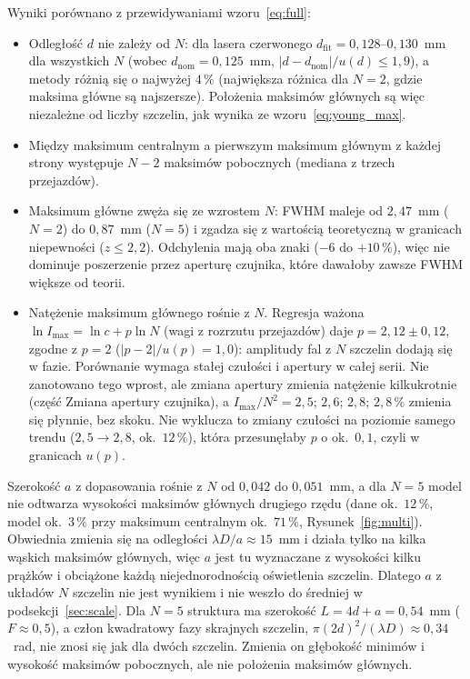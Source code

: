 \documentclass[12pt, a4paper]{article}
\begin{document}
Wyniki porównano z przewidywaniami wzoru~\eqref{eq:full}:
\begin{itemize}
    \item Odległość $d$ nie zależy od $N$: dla lasera czerwonego $d_\text{fit} = 0{,}128$--$0{,}130$~mm
          dla wszystkich $N$ (wobec $d_\text{nom} = 0{,}125$~mm, $|d - d_\text{nom}|/u(d) \le 1{,}9$), a metody różnią się o najwyżej $4\,\%$ (największa różnica dla $N = 2$,
          gdzie maksima główne są najszersze). Położenia maksimów głównych są więc niezależne
          od liczby szczelin, jak wynika ze wzoru~\eqref{eq:young_max}.
    \item Między maksimum centralnym a pierwszym maksimum głównym z każdej strony występuje
          $N - 2$ maksimów pobocznych (mediana z trzech przejazdów).
    \item Maksimum główne zwęża się ze wzrostem $N$: FWHM maleje od $2{,}47$~mm ($N = 2$)
          do $0{,}87$~mm ($N = 5$) i zgadza się z wartością teoretyczną w granicach niepewności
          ($z \le 2{,}2$). Odchylenia mają oba znaki ($-6$ do $+10\,\%$), więc nie dominuje
          poszerzenie przez aperturę czujnika, które dawałoby zawsze FWHM większe od teorii.
    \item Natężenie maksimum głównego rośnie z $N$. Regresja ważona $\ln I_\text{max} = \ln c + p\ln N$
          (wagi z rozrzutu przejazdów) daje $p = 2{,}12 \pm 0{,}12$, zgodne z $p = 2$
          ($|p - 2|/u(p) = 1{,}0$): amplitudy fal z $N$ szczelin dodają się w fazie. Porównanie
          wymaga stałej czułości i apertury w całej serii. Nie zanotowano tego wprost, ale
          zmiana apertury zmienia natężenie kilkukrotnie (część Zmiana apertury czujnika),
          a $I_\text{max}/N^2 = 2{,}5$; $2{,}6$; $2{,}8$; $2{,}8\,\%$ zmienia się płynnie, bez skoku.
          Nie wyklucza to zmiany czułości na poziomie samego trendu ($2{,}5 \to 2{,}8$, ok.\ $12\,\%$),
          która przesunęłaby $p$ o ok.\ $0{,}1$, czyli w granicach $u(p)$.
\end{itemize}
Szerokość $a$ z dopasowania rośnie z $N$ od $0{,}042$ do $0{,}051$~mm, a dla $N = 5$ model
nie odtwarza wysokości maksimów głównych drugiego rzędu (dane ok.\ $12\,\%$, model ok.\ $3\,\%$
przy maksimum centralnym ok.\ $71\,\%$, Rysunek~\ref{fig:multi}). Obwiednia zmienia się na odległości
$\lambda D/a \approx 15$~mm i działa tylko na kilka wąskich maksimów głównych, więc $a$ jest tu
wyznaczane z wysokości kilku prążków i obciążone każdą niejednorodnością oświetlenia
szczelin. Dlatego $a$ z układów $N$ szczelin nie jest wynikiem i nie weszło do średniej
w podsekcji~\ref{sec:scale}. Dla $N = 5$ struktura ma szerokość $L = 4d + a = 0{,}54$~mm
($F \approx 0{,}5$), a człon kwadratowy fazy skrajnych szczelin, $\pi(2d)^2/(\lambda D) \approx
0{,}34$~rad, nie znosi się jak dla dwóch szczelin. Zmienia on głębokość minimów i wysokość
maksimów pobocznych, ale nie położenia maksimów głównych.
\end{document}
